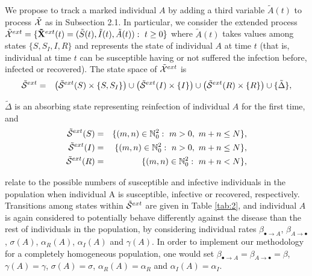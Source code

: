 \documentclass[preprint,12pt]{elsarticle}
\begin{document}
\par We propose to track a marked individual $A$ by adding a third variable ${\tilde A}(t)$ to process ${\cal \tilde X}$ as in Subsection 2.1. In
particular, we consider the extended process ${\cal \tilde X}^{ext}=\{{\bf \tilde X}^{ext}(t)=({\tilde S}(t),{\tilde I}(t),{\tilde A}(t)):\ t\geq0\}$ where
${\tilde A}(t)$ takes values among states $\{S,S_I,I,R\}$ and represents the state of individual $A$ at time $t$ (that is, individual at time $t$ can be
susceptible having or not suffered the infection before, infected or recovered). The state space of
${\cal \tilde X}^{ext}$ is
\begin{eqnarray*}
 {\cal \tilde S}^{ext} &=& \left({\cal \tilde S}^{ext}(S)\times\{S,S_I\}\right)\cup\left({\cal \tilde S}^{ext}(I)\times\{I\}\right)\cup\left({\cal \tilde S}^{ext}(R)\times\{R\}\right)\cup\{\tilde \Delta\},
\end{eqnarray*}
\par\noindent ${\tilde \Delta}$ is an absorbing state representing reinfection of individual $A$ for the first time, and
\begin{eqnarray*}
{\cal \tilde S}^{ext}(S) &=& \{(m,n)\in\mathbb{N}_0^2:\ m>0,\ m+n\leq N\},\\
{\cal \tilde S}^{ext}(I) &=& \{(m,n)\in\mathbb{N}_0^2:\ n>0,\ m+n\leq N\},\\
{\cal \tilde S}^{ext}(R) &=& \{(m,n)\in\mathbb{N}_0^2:\ m+n<N\},
\end{eqnarray*}
\par\noindent relate to the possible numbers of susceptible and infective individuals in the population when individual A is susceptible, infective
or recovered, respectively. Transitions among states within ${\cal \tilde S}^{ext}$ are given in Table \ref{tab:2}, and individual $A$ is again considered to potentially
behave differently against the disease than the rest of individuals in the population, by considering individual rates $\beta_{\bullet\rightarrow A}$,
$\beta_{A\rightarrow\bullet}$, $\sigma(A)$, $\alpha_R(A)$, $\alpha_I(A)$ and $\gamma(A)$. In order to implement our methodology for a completely homogeneous
population, one would set $\beta_{\bullet\rightarrow A}=\beta_{A\rightarrow\bullet}=\beta$, $\gamma(A)=\gamma$, $\sigma(A)=\sigma$, $\alpha_R(A)=\alpha_R$ and $\alpha_I(A)=\alpha_I$.\\
\end{document}
